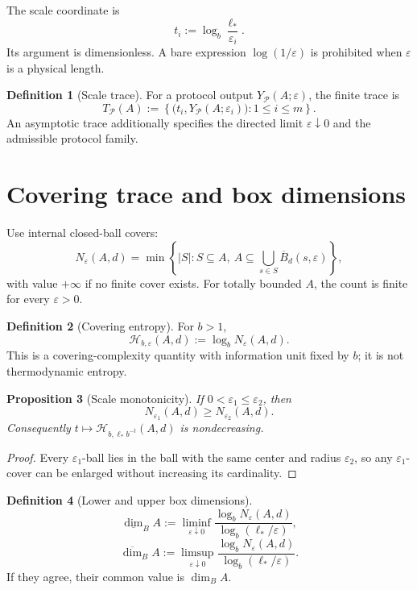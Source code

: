 \documentclass[11pt,a4paper]{article}
\theoremstyle{definition}
\newtheorem{definition}{Definition}[section]
\theoremstyle{plain}
\newtheorem{proposition}[definition]{Proposition}
\theoremstyle{remark}
\newcommand{\Pcal}{\mathcal{P}}
\newcommand{\Hmet}{\mathscr{H}}
\newcommand{\abs}[1]{\left\lvert #1\right\rvert}
\newcommand{\set}[1]{\left\{#1\right\}}
\begin{document}
The scale coordinate is
\[
 t_i
 :=
 \log_b\frac{\ell_*}{\varepsilon_i}.
\]
Its argument is dimensionless. A bare expression
$\log(1/\varepsilon)$ is prohibited when $\varepsilon$ is a physical
length.

\begin{definition}[Scale trace]
For a protocol output $Y_\Pcal(A;\varepsilon)$, the finite trace is
\[
 T_\Pcal(A)
 :=
 \set{\bigl(t_i,Y_\Pcal(A;\varepsilon_i)\bigr):1\leq i\leq m}.
\]
An asymptotic trace additionally specifies the directed limit
$\varepsilon\downarrow0$ and the admissible protocol family.
\end{definition}

\section{Covering trace and box dimensions}

Use internal closed-ball covers:
\[
N_\varepsilon(A,d)
=
\min\left\{
\abs S:
S\subseteq A,\ 
A\subseteq\bigcup_{s\in S}\overline B_d(s,\varepsilon)
\right\},
\]
with value $+\infty$ if no finite cover exists. For totally bounded $A$,
the count is finite for every $\varepsilon>0$.

\begin{definition}[Covering entropy]
For $b>1$,
\[
\Hmet_{b,\varepsilon}(A,d)
:=
\log_bN_\varepsilon(A,d).
\]
This is a covering-complexity quantity with information unit fixed by
$b$; it is not thermodynamic entropy.
\end{definition}

\begin{proposition}[Scale monotonicity]
\label{prop:monotone}
If $0<\varepsilon_1\leq\varepsilon_2$, then
\[
 N_{\varepsilon_1}(A,d)\geq N_{\varepsilon_2}(A,d).
\]
Consequently $t\mapsto\Hmet_{b,\ell_*b^{-t}}(A,d)$ is nondecreasing.
\end{proposition}

\begin{proof}
Every $\varepsilon_1$-ball lies in the ball with the same center and
radius $\varepsilon_2$, so any $\varepsilon_1$-cover can be enlarged
without increasing its cardinality.
\end{proof}

\begin{definition}[Lower and upper box dimensions]
\label{def:box}
\[
\underline{\dim}_{B}A
:=
\liminf_{\varepsilon\downarrow0}
\frac{\log_bN_\varepsilon(A,d)}
     {\log_b(\ell_*/\varepsilon)},
\]
\[
\overline{\dim}_{B}A
:=
\limsup_{\varepsilon\downarrow0}
\frac{\log_bN_\varepsilon(A,d)}
     {\log_b(\ell_*/\varepsilon)}.
\]
If they agree, their common value is $\dim_BA$.
\end{definition}
\end{document}
